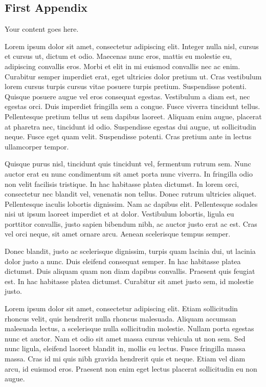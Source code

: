 \documentclass[12pt,lot,lof]{quthesis}
\begin{document}
\begin{appendices}


\chapter{First Appendix}
Your content goes here.

Lorem ipsum dolor sit amet, consectetur adipiscing elit. Integer nulla nisl, cursus et cursus ut, dictum et odio. Maecenas nunc eros, mattis eu molestie eu, adipiscing convallis eros. Morbi et elit in mi euismod convallis nec ac enim. Curabitur semper imperdiet erat, eget ultricies dolor pretium ut. Cras vestibulum lorem cursus turpis cursus vitae posuere turpis pretium. Suspendisse potenti. Quisque posuere augue vel eros consequat egestas. Vestibulum a diam est, nec egestas orci. Duis imperdiet fringilla sem a congue. Fusce viverra tincidunt tellus. Pellentesque pretium tellus ut sem dapibus laoreet. Aliquam enim augue, placerat at pharetra nec, tincidunt id odio. Suspendisse egestas dui augue, ut sollicitudin neque. Fusce eget quam velit. Suspendisse potenti. Cras pretium ante in lectus ullamcorper tempor.

Quisque purus nisl, tincidunt quis tincidunt vel, fermentum rutrum sem. Nunc auctor erat eu nunc condimentum sit amet porta nunc viverra. In fringilla odio non velit facilisis tristique. In hac habitasse platea dictumst. In lorem orci, consectetur nec blandit vel, venenatis non tellus. Donec rutrum ultricies aliquet. Pellentesque iaculis lobortis dignissim. Nam ac dapibus elit. Pellentesque sodales nisi ut ipsum laoreet imperdiet et at dolor. Vestibulum lobortis, ligula eu porttitor convallis, justo sapien bibendum nibh, ac auctor justo erat ac est. Cras vel orci neque, sit amet ornare arcu. Aenean scelerisque tempus semper.

Donec blandit, justo ac scelerisque dignissim, turpis quam lacinia dui, ut lacinia dolor justo a nunc. Duis eleifend consequat semper. In hac habitasse platea dictumst. Duis aliquam quam non diam dapibus convallis. Praesent quis feugiat est. In hac habitasse platea dictumst. Curabitur sit amet justo sem, id molestie justo.

Lorem ipsum dolor sit amet, consectetur adipiscing elit. Etiam sollicitudin rhoncus velit, quis hendrerit nulla rhoncus malesuada. Aliquam accumsan malesuada lectus, a scelerisque nulla sollicitudin molestie. Nullam porta egestas nunc et auctor. Nam et odio sit amet massa cursus vehicula ut non sem. Sed nunc ligula, eleifend laoreet blandit in, mollis eu lectus. Fusce fringilla massa massa. Cras id mi quis nibh gravida hendrerit quis et neque. Etiam vel diam arcu, id euismod eros. Praesent non enim eget lectus placerat sollicitudin eu non augue.


\end{appendices}
\end{document}
